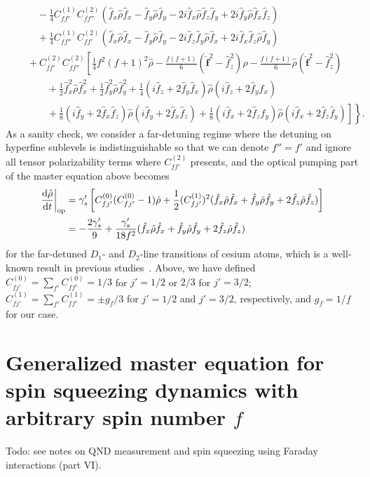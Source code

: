 \documentclass[preprint,aps,pra,onecolumn,superscriptaddress]{revtex4-1} %
\newcommand{\dt}[1]{\frac{{\mathrm d} {#1}}{{\mathrm d}t}}
\newcommand{\nn}{\nonumber}
\newcommand{\fo}{\hat{\mathbf{f}}}
\newcommand{\fx}{\hat{f}_x}
\newcommand{\fy}{\hat{f}_y}
\newcommand{\fz}{\hat{f}_z}
\newcommand{\rhoo}{\hat{\rho}}
\newcommand{\comment}[1]{{\color{Maroon} #1}}
\begin{document}
\begin{appendix}
\begin{align}
&\quad\quad -\frac{1}{4}C_{ff'}^{(1)}C_{ff''}^{(2)}(\fx\rhoo\fx-\fy\rhoo\fy-2i\fx\rhoo\fz\fy+2i\fy\rhoo\fx\fz )\nn\\
&\quad\quad +\frac{1}{4}C_{ff''}^{(1)}C_{ff'}^{(2)}(\fx\rhoo\fx-\fy\rhoo\fy-2i\fz\fy\rhoo\fx+2i\fx\fz\rhoo\fy ) \nn\\
&\quad +C_{ff'}^{(2)}C_{ff''}^{(2)}\left[\frac{1}{4}f^2(f+1)^2\rhoo-\frac{f(f+1)}{6}(\fo^2-\fz^2)\rhoo-\frac{f(f+1)}{6}\rhoo(\fo^2-\fz^2) \right.\nn\\
&\quad\quad\quad+\frac{1}{2}\fx^2\rhoo\fx^2+\frac{1}{2}\fy^2\rhoo\fy^2+\frac{1}{4}(i\fz+2\fy\fx)\rhoo(i\fz+2\fy\fx)\nn\\
&\left.\left.\quad\quad\quad +\frac{1}{8}(i\fy+2\fx\fz)\rhoo(i\fy+2\fx\fz)+\frac{1}{8}(i\fx+2\fz\fy)\rhoo(i\fx+2\fz\fy) \right]\right\}.
\end{align}
As a sanity check, we consider a far-detuning regime where the detuning on hyperfine sublevels is indistinguishable so that we can denote $ f''=f' $ and ignore all tensor polarizability terms where $ C_{ff'}^{(2)} $ presents, and the optical pumping part of the master equation above becomes
\begin{align}
\left.\dt{\rhoo}\right|_{\rm op} &= \gamma'_s  \left[C_{fj'}^{(0)}(C_{fj'}^{(0)}-1)\rhoo+\frac{1}{2}(C_{fj'}^{(1)})^2(\fx\rhoo\fx+\fy\rhoo\fy+2\fz\rhoo\fz ) \right]\\
&= -\frac{2\gamma'_s}{9}+\frac{\gamma'_s}{18f^2}(\fx\rhoo\fx+\fy\rhoo\fy+2\fz\rhoo\fz )
\end{align}
for the far-detuned $ D_1 $- and $ D_2 $-line transitions of cesium atoms,
which is a well-known result in previous studies~\cite{Deutsch2010a,Baragiola2014}.
Above, we have defined $ C_{fj'}^{(0)}=\sum_{f'}C^{(0)}_{ff'}=1/3  $ for $ j'=1/2 $ or $ 2/3 $ for $ j'=3/2 $; $ C^{(1)}_{fj'}=\sum_{f'}C^{(1)}_{ff'}=\pm g_f/3 $ for $ j'=1/2 $ and $ j'=3/2 $, respectively, and $ g_f=1/f $ for our case. 


\section{Generalized master equation for spin squeezing dynamics with arbitrary spin number $f$} \label{Appendix::OpticalPumpingForGeneralF}
\comment{Todo: see notes on QND measurement and spin squeezing using Faraday interactions (part VI).}



\end{appendix}
\end{document}

